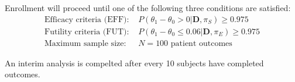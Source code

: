 \documentclass[12pt]{article}
\begin{document}





%				

Enrollment will proceed until one of the following three conditions are satisfied:
\begin{align*}
\text{Efficacy criteria (EFF): }&P(\theta_1-\theta_0>0|\mathbf{D},\pi_S)\geq 0.975\\
\text{Futility criteria (FUT): }&P(\theta_1-\theta_0 \leq 0.06|\mathbf{D},\pi_E)\geq 0.975\\
\text{Maximum sample size: }&N=100 \text{ patient outcomes}
\end{align*}

An interim analysis is compelted after every 10 subjects have completed outcomes.
\end{document}
